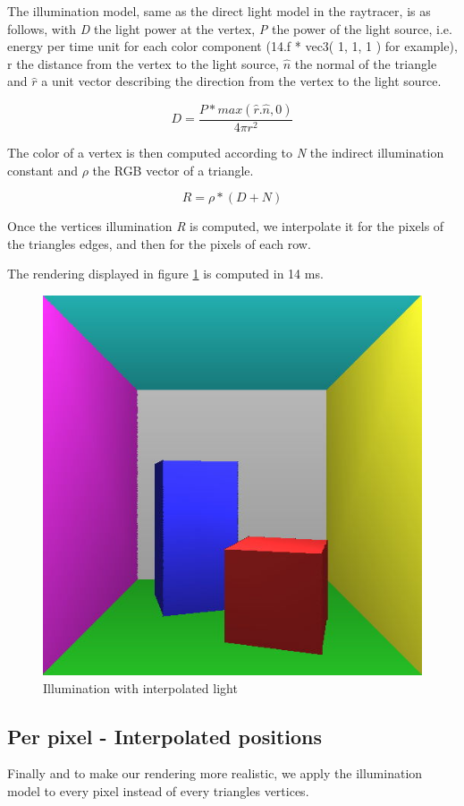 The illumination model, same as the direct light model in the raytracer, is as follows, with \textit{D} the light power at the vertex, \textit{P} the power of the light source, i.e. energy per time unit for each color component (14.f * vec3( 1, 1, 1 ) for example), r the distance from the vertex to the light source, $\hat{n}$ the normal of the triangle and $\hat{r}$ a unit vector describing the direction from the vertex to the light source.

\begin{equation}
\label{eq:power}
D = \frac{P * max(\hat{r} . \hat{n}, 0)}{4 \pi r^2}
\end{equation}

The color of a vertex is then computed according to \textit{N} the indirect illumination constant and $\rho$ the RGB vector of a triangle.

\begin{equation}
R = \rho * (D+N)
\end{equation}

Once the vertices illumination \textit{R} is computed, we interpolate it for the pixels of the triangles edges, and then for the pixels of each row.

The rendering displayed in figure \ref{fig:interpolated_light} is computed in 14 ms.

\begin{figure}[H]
\centering
\includegraphics[width=0.4\linewidth]{img/interpolated_light.jpg}
\caption{Illumination with interpolated light}
\label{fig:interpolated_light}
\end{figure}

\subsection{Per pixel - Interpolated positions}
\label{subsec:perpixel}

Finally and to make our rendering more realistic, we apply the illumination model to every pixel instead of every triangles vertices.

